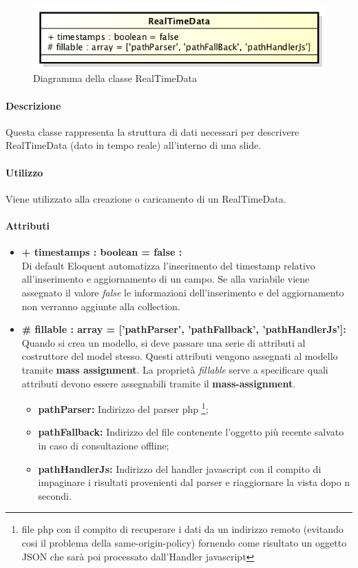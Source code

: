 	\begin{figure}[h]
		\centering
		\includegraphics[width=0.5\linewidth]{img/back_end_premi_model_realTimeData}
		\caption[Diagramma della classe RealTimeData]{Diagramma della classe RealTimeData}
		\label{fig:back_end_premi_model_realTimeData}
	\end{figure}


	\paragraph{Descrizione}
	Questa classe rappresenta la struttura di dati necessari per descrivere RealTimeData (dato in tempo reale) all'interno di una slide.
	
	\paragraph{Utilizzo}
	Viene utilizzato alla creazione o caricamento di un RealTimeData.
	
	\paragraph{Attributi}
	\begin{itemize}
		\item \textbf{+ timestamps : boolean = false :}\\
		Di default Eloquent automatizza l'inserimento del timestamp relativo all'inserimento e aggiornamento di un campo. Se alla variabile viene assegnato il valore \textit{false} le informazioni dell'inserimento e del aggiornamento non verranno aggiunte alla collection.
		\item \textbf{\# fillable : array = ['pathParser’, ’pathFallback’, ’pathHandlerJs']:}\\
		Quando si crea un modello, si deve passare una serie di attributi al costruttore del model stesso. Questi attributi vengono assegnati al modello tramite \textbf{mass assignment}. La proprietà \textit{fillable} serve a specificare quali attributi devono essere assegnabili tramite il \textbf{mass-assignment}.
		\begin{itemize}
			\item \textbf{pathParser:} Indirizzo del parser php \footnote{file php con il compito di recuperare i dati da un indirizzo remoto (evitando cosi il problema della same-origin-policy) fornendo come risultato un oggetto JSON che sarà poi processato dall'Handler javascript};
			\item \textbf{pathFallback:} Indirizzo del file contenente l'oggetto più recente salvato in caso di consultazione offline;
			\item \textbf{pathHandlerJs:} Indirizzo del handler javascript con il compito di impaginare i risultati provenienti dal parser e riaggiornare la vista dopo n secondi.
		\end{itemize}
	\end{itemize}
\newpage


